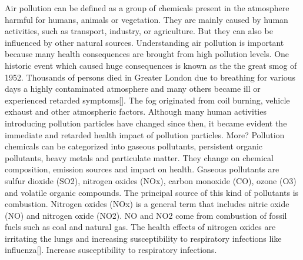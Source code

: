 Air pollution can be defined as a group of chemicals present in the atmosphere harmful for humans, animals or vegetation. They are mainly caused by human activities, such as transport, industry, or agriculture. But they can also be influenced by other natural sources. Understanding air pollution is important because many health consequences are brought from high pollution levels. 
One historic event which caused huge consequences is known as the the great smog of 1952. Thousands of persons died in Greater London due to  breathing for various days a highly contaminated atmosphere and many others became ill or experienced retarded symptoms[]. The fog originated from coil burning, vehicle exhaust and other atmospheric factors. Although many human activities introducing pollution particles have changed since then, it became evident the immediate and retarded health impact of pollution particles. More?
Pollution chemicals can be categorized into gaseous pollutants, persistent organic pollutants, heavy metals and particulate matter. They change on chemical composition, emission sources and impact on health. 
Gaseous pollutants are sulfur dioxide (SO2), nitrogen oxides (NOx), carbon monoxide (CO), ozone (O3) and volatile organic compounds. The principal source of this kind of pollutants is combustion.
Nitrogen oxides (NOx) is a general term that includes nitric oxide (NO) and nitrogen oxide (NO2). NO and NO2 come from combustion of fossil fuels such as coal and natural gas. The health effects of nitrogen oxides are irritating the lungs and increasing susceptibility to respiratory infections like influenza[].
Increase susceptibility to respiratory infections. 
